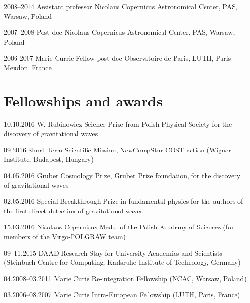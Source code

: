 \documentclass[]{friggeri-cv} %
\begin{document}
\begin{entrylist}

\entry
{2008--2014}
{Assistant professor}
{Nicolaus Copernicus Astronomical Center, PAS, Warsaw, Poland}

\entry
{2007--2008}
{Post-doc}
{Nicolaus Copernicus Astronomical Center, PAS, Warsaw, Poland}

\entry
{2006-2007}
{Marie Currie Fellow post-doc}
{Observatoire de Paris, LUTH, Paris-Meudon, France}

\end{entrylist}


\section{Fellowships and awards}

\begin{entrylistshort}

\entrys 
{10.10.2016}
{W. Rubinowicz Science Prize from Polish Physical Society for the discovery of gravitational waves}  

\entrys
{09.2016}
{Short Term Scientific Mission, NewCompStar COST action (Wigner Institute, Budapest, Hungary)}

\entrys 
{04.05.2016}
{Gruber Cosmology Prize, Gruber Prize foundation, for the discovery of gravitational waves}  

\entrys 
{02.05.2016}
{Special Breakthrough Prize in fundamental physics for the authors of the first direct detection of gravitational waves}  

\entrys
{15.03.2016} 
{Nicolaus Copernicus Medal of the Polish Academy of Sciences (for members of the Virgo-POLGRAW team)}   

\entrys
{09--11.2015} 
{DAAD Research Stay for University Academics and Scientists (Steinbuch Centre for Computing, Karlsruhe Institute of Technology, Germany)}  

\entrys 
{04.2008--03.2011} 
{Marie Curie Re-integration Fellowship (NCAC, Warsaw, Poland)}   

\entrys 
{03.2006--08.2007} 
{Marie Curie Intra-European Fellowship (LUTH, Paris, France)} 

\end{entrylistshort}
\end{document}
